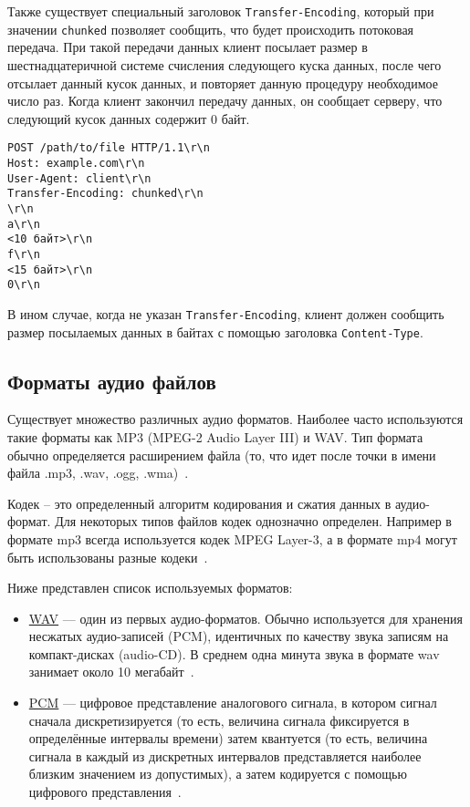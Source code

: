 Также существует специальный заголовок \texttt{Transfer-Encoding}, который при
значении \texttt{chunked} позволяет сообщить, что будет происходить потоковая передача.
При такой передачи данных клиент посылает размер в шестнадцатеричной системе
счисления следующего куска данных, после чего отсылает данный кусок данных, и
повторяет данную процедуру необходимое число раз. \mbox{Когда} клиент закончил передачу данных,
он сообщает серверу, что следующий кусок данных содержит 0 байт.

\begin{lstlisting}[caption={Пример \texttt{Transfer-Encoding: chunked}}, label={lst:http:chunked}]
POST /path/to/file HTTP/1.1\r\n
Host: example.com\r\n
User-Agent: client\r\n
Transfer-Encoding: chunked\r\n
\r\n
a\r\n
<10 байт>\r\n
f\r\n
<15 байт>\r\n
0\r\n
\end{lstlisting}

В ином случае, когда не указан \texttt{Transfer-Encoding}, клиент должен \mbox{сообщить}
размер посылаемых данных в байтах с помощью заголовка \texttt{Content-Type}.

\subsection{Форматы аудио файлов}
Существует множество различных аудио форматов. Наиболее часто используются такие
форматы как MP3 (MPEG-2 Audio Layer III) и WAV. Тип формата обычно определяется
расширением файла (то, что идет после точки в имени файла .mp3, .wav, .ogg, .wma)~\cite{audio}.

Кодек – это определенный алгоритм кодирования и сжатия данных в аудио-формат.
Для некоторых типов файлов кодек однозначно определен. Например в формате mp3
всегда используется кодек MPEG Layer-3, а в формате mp4 могут быть использованы
разные кодеки~\cite{audio}.

Ниже представлен список используемых форматов:
\begin{itemize}
    \item \hyperlink{wav}{WAV} --– один из первых аудио-форматов. Обычно используется для хранения
    несжатых аудио-записей (PCM), идентичных по качеству звука записям на
    компакт-дисках (audio-CD). В среднем одна минута звука в формате wav занимает
    около 10 мегабайт~\cite{audio}.
    \item \hyperlink{pcm}{PCM} --- цифровое представление аналогового сигнала, в
    котором сигнал сначала дискретизируется (то есть, величина сигнала фиксируется
    в определённые интервалы времени) затем квантуется (то есть, величина сигнала
    в каждый из дискретных интервалов представляется наиболее близким значением из
    допустимых), а затем кодируется с помощью цифрового представления~\cite{pcm}.
\end{itemize}

